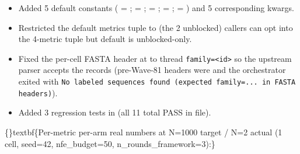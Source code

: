 \documentclass{article}
\begin{document}
\begin{itemize}
\item Added 5 default constants ( = ;  = ;  = ;  = ;  = ) and 5 corresponding kwargs.
\item Restricted the default metrics tuple to  (the 2 unblocked)  callers can opt into the 4-metric tuple but default is unblocked-only.
\item Fixed the per-cell FASTA header at  to thread \texttt{family=<id>} so the upstream  parser accepts the records (pre-Wave-81 headers were  and the orchestrator exited with \texttt{No labeled sequences found (expected family=... in FASTA headers)}).
\item Added 3 regression tests in  (all 11 total PASS in file).
\end{itemize}
\{\}textbf\{Per-metric per-arm real numbers at N=1000 target / N=2 actual (1 cell, seed=42, nfe\_budget=50, n\_rounds\_framework=3):\}
\end{document}
